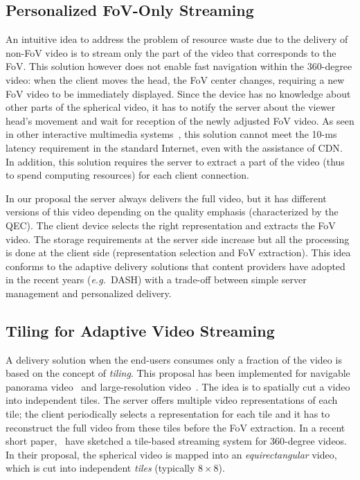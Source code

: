 \subsection{Personalized FoV-Only Streaming}

An intuitive idea to address the problem of resource waste due to the delivery of non-FoV video
is to stream only the part of the video that corresponds to the \ac{FoV}. This solution however
does not enable fast navigation within the 360-degree video: when the client moves the head,
the FoV
center changes, requiring a new FoV video to be immediately displayed. Since
the device has no knowledge about other parts of the spherical video, it has to notify
the server about the viewer head's movement and wait for reception of the newly
adjusted FoV video. As seen in other interactive multimedia systems~\cite{ChoyWSR14},
this solution cannot meet the 10-ms latency requirement in the standard Internet, even
with the assistance of \ac{CDN}. In addition, this solution requires the server to extract
a part of the video (thus to spend computing resources) for each
client connection.

 In our proposal the server always delivers the full video, but it
has different versions of this video depending on the quality emphasis (characterized by the QEC).
The client
device selects the right representation and extracts the \ac{FoV} video. The storage
requirements at the
server side increase but all the processing is done at the client side (representation selection
and FoV extraction).
This idea conforms to the adaptive delivery solutions
that content providers have adopted in the recent years (\textit{e.g.}~\ac{DASH}) with
a trade-off between simple server management and personalized delivery.

\subsection{Tiling for Adaptive Video Streaming}

A delivery solution when the end-users consumes only a fraction of the video is based on the concept of \emph{tiling}.
This proposal has been implemented for navigable panorama
video~\cite{sanchez_compressed_2015,wang_mixing_2014,gaddam_tiling_2015} and
large-resolution video~\cite{jean16mmsys}.
The idea is to spatially cut a video into independent tiles. The server offers
multiple video representations of each tile; the client periodically selects a representation
for each tile
and it has to reconstruct
the full video from these tiles before the \ac{FoV} extraction. In a recent short
paper,~\citet{ochi_live_2015} have sketched a tile-based streaming system for 360-degree
videos.
In their proposal, the spherical video is mapped into an \emph{equirectangular} video, which
is cut into independent \emph{tiles} (typically $8\times 8$).

